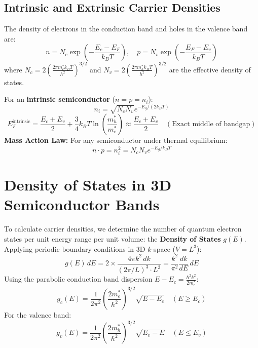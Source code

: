 \subsection{Intrinsic and Extrinsic Carrier Densities}
The density of electrons in the conduction band and holes in the valence band are:
\begin{equation}
n = N_c \exp\left(-\frac{E_c - E_F}{k_B T}\right), \quad p = N_v \exp\left(-\frac{E_F - E_v}{k_B T}\right)
\end{equation}
where $N_c = 2\left(\frac{2\pi m_e^* k_B T}{h^2}\right)^{3/2}$ and $N_v = 2\left(\frac{2\pi m_h^* k_B T}{h^2}\right)^{3/2}$ are the effective density of states.

For an \textbf{intrinsic semiconductor} ($n = p = n_i$):
\begin{equation}
n_i = \sqrt{N_c N_v} e^{-E_g / (2k_B T)}
\end{equation}
\begin{equation}
E_F^{\text{intrinsic}} = \frac{E_c + E_v}{2} + \frac{3}{4}k_B T \ln\left(\frac{m_h^*}{m_e^*}\right) \approx \frac{E_c + E_v}{2} \quad (\text{Exact middle of bandgap})
\end{equation}
\textbf{Mass Action Law:} For any semiconductor under thermal equilibrium:
\begin{equation}
n \cdot p = n_i^2 = N_c N_v e^{-E_g / k_B T}
\end{equation}


\section{Density of States in 3D Semiconductor Bands}
To calculate carrier densities, we determine the number of quantum electron states per unit energy range per unit volume: the \textbf{Density of States} $g(E)$.
Applying periodic boundary conditions in 3D $k$-space ($V = L^3$):
\begin{equation}
g(E)\,dE = 2 \times \frac{4\pi k^2 \, dk}{(2\pi/L)^3 \cdot L^3} = \frac{k^2}{\pi^2}\frac{dk}{dE} \, dE
\end{equation}
Using the parabolic conduction band dispersion $E - E_c = \frac{\hbar^2 k^2}{2m_e^*}$:
\begin{equation}
g_c(E) = \frac{1}{2\pi^2}\left(\frac{2m_e^*}{\hbar^2}\right)^{3/2}\sqrt{E - E_c} \quad (E \ge E_c)
\end{equation}
For the valence band:
\begin{equation}
g_v(E) = \frac{1}{2\pi^2}\left(\frac{2m_h^*}{\hbar^2}\right)^{3/2}\sqrt{E_v - E} \quad (E \le E_v)
\end{equation}

